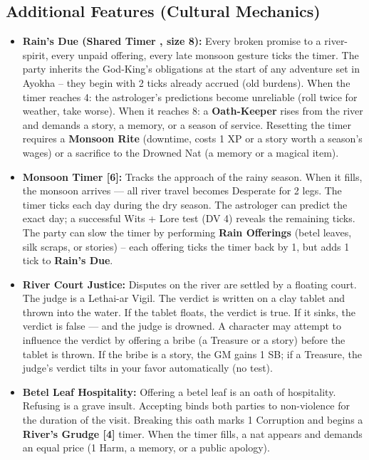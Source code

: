 \subsection*{Additional Features (Cultural Mechanics)}
\label{sec:ayokha-features}

\begin{itemize}
\item \textbf{Rain's Due (Shared Timer , size 8):} Every broken promise to a river-spirit, every unpaid offering, every late monsoon gesture ticks the timer. The party inherits the God-King's obligations at the start of any adventure set in Ayokha -- they begin with 2 ticks already accrued (old burdens). When the timer reaches 4: the astrologer's predictions become unreliable (roll twice for weather, take worse). When it reaches 8: a \textbf{Oath-Keeper} rises from the river and demands a story, a memory, or a season of service. Resetting the timer requires a \textbf{Monsoon Rite} (downtime, costs 1 XP or a story worth a season's wages) or a sacrifice to the Drowned Nat (a memory or a magical item).

\item \textbf{Monsoon Timer [6]:} Tracks the approach of the rainy season. When it fills, the monsoon arrives --- all river travel becomes Desperate for 2 legs. The timer ticks each day during the dry season. The astrologer can predict the exact day; a successful Wits + Lore test (DV 4) reveals the remaining ticks. The party can slow the timer by performing \textbf{Rain Offerings} (betel leaves, silk scraps, or stories) -- each offering ticks the timer back by 1, but adds 1 tick to \textbf{Rain's Due}.

\item \textbf{River Court Justice:} Disputes on the river are settled by a floating court. The judge is a Lethai-ar Vigil. The verdict is written on a clay tablet and thrown into the water. If the tablet floats, the verdict is true. If it sinks, the verdict is false --- and the judge is drowned. A character may attempt to influence the verdict by offering a bribe (a Treasure or a story) before the tablet is thrown. If the bribe is a story, the GM gains 1 SB; if a Treasure, the judge's verdict tilts in your favor automatically (no test).

\item \textbf{Betel Leaf Hospitality:} Offering a betel leaf is an oath of hospitality. Refusing is a grave insult. Accepting binds both parties to non-violence for the duration of the visit. Breaking this oath marks 1 Corruption and begins a \textbf{River's Grudge [4]} timer. When the timer fills, a nat appears and demands an equal price (1 Harm, a memory, or a public apology).


\end{itemize}
